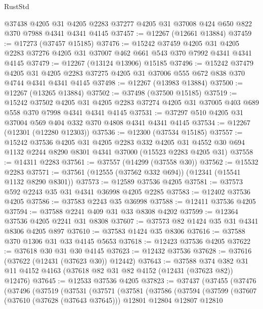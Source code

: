 \begin{lexlean}{RustStd}
\begin{coremodule}
    @37438
    @4205
    @31
    @4205
    @2283
    @37277
    @4205
    @31
    @37008
    @424
    @650
    @822
    @370
    @7988
    @4341
    @4341
    @4145
@37457 := @12267 (@12661 @13884)
@37459 := @17273 (@37457 @15185)
@37476 := @15242
    @37459
    @4205
    @31
    @4205
    @2283
    @37276
    @4205
    @31
    @37007
    @462
    @661
    @543
    @370
    @7992
    @4341
    @4341
    @4145
@37479 := @12267 (@13124 @13906) @15185
@37496 := @15242
    @37479
    @4205
    @31
    @4205
    @2283
    @37275
    @4205
    @31
    @37006
    @555
    @672
    @838
    @370
    @4744
    @4341
    @4341
    @4145
@37498 := @12267 (@13983 @13884)
@37500 := @12267 (@13265 @13884)
@37502 := @37498 (@37500 @15185)
@37519 := @15242
    @37502
    @4205
    @31
    @4205
    @2283
    @37274
    @4205
    @31
    @37005
    @403
    @689
    @558
    @370
    @7998
    @4341
    @4341
    @4145
@37531 := @37297 @510 @4205 @31 @37004 @569 @404 @332 @370 @4808 @4341 @4341 @4145
@37534 := @12267 (@12301 (@12280 @12303))
@37536 := @12300 (@37534 @15185)
@37557 := @15242
    @37536
    @4205
    @31
    @4205
    @2283
    @332
    @4205
    @31
    @4552
    @30
    @694
    @1132
    @2244
    @8290
    @8301
    @4341
    @37000
    (@15523 @2283 @4205 @31)
@37558 := @14311 @2283
@37561 := @37557 (@14299 (@37558 @30))
@37562 := @15532 @2283
@37571 := @37561 (@12555 (@37562 @332 @694)) (@12341 (@15541 @1132 @8290 @8301))
@37573 := @12589 @37536 @4205
@37581 := @37573 @592 @2243 @35 @31 @4341 @36998 @4205 @2285
@37583 := @12402 @37536 @4205
@37586 := @37583 @2243 @35 @36998
@37588 := @12411 @37536 @4205
@37594 := @37588 @2241 @409 @31 @33 @8308 @4202
@37599 := @12364 @37536 @4205 @2241 @31 @8308
@37607 := @37573 @82 @1424 @35 @31 @4341 @8306 @4205 @897
@37610 := @37583 @1424 @35 @8306
@37616 := @37588 @370 @1306 @31 @33 @4145 @5653
@37618 := @12423 @37536 @4205
@37622 := @37618 @30 @31 @30 @4145
@37623 := @12432 @37536
@37628 := @37616 (@37622 (@12431 (@37623 @30)) @12442)
@37643 := @37588
    @374
    @382
    @31
    @11
    @4152
    @4163
    (@37618 @82 @31 @82 @4152 (@12431 (@37623 @82)) @12476)
@37645 := @12533 @37536 @4205
@37823 := @37437
    (@37455
      (@37476
        (@37496
          (@37519
            (@37531
              (@37571
                (@37581
                  (@37586
                    (@37594
                      (@37599
                        (@37607
                          (@37610 (@37628 (@37643 @37645)))
                          @12801
                          @12804
                          @12807
                          @12810

\end{coremodule}
\end{lexlean}
